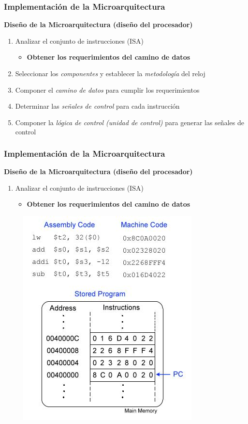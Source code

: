 \documentclass[aspectratio=169,compress]{beamer}
\begin{document}
\begin{footnotesize}
\begin{frame}
\frametitle{Implementación de la Microarquitectura}
\begin{center}\textbf{Diseño de la Microarquitectura (diseño del procesador)}\end{center}
\begin{enumerate}
\item Analizar el conjunto de instrucciones (ISA)
\begin{itemize}
\item \textbf{Obtener los requerimientos del camino de datos}
\end{itemize}
\item Seleccionar los \textit{componentes} y establecer la \textit{metodología} del reloj
\item Componer el \textit{camino de datos} para cumplir los requerimientos
\item Determinar las \textit{señales de control} para cada instrucción
\item Componer la \textit{lógica de control (unidad de control)} para generar las señales de control
\end{enumerate}
\end{frame}


\begin{frame}
\frametitle{Implementación de la Microarquitectura}
\begin{center}\textbf{Diseño de la Microarquitectura (diseño del procesador)}\end{center}
\begin{enumerate}
\item Analizar el conjunto de instrucciones (ISA)
\begin{itemize}
\item \textbf{Obtener los requerimientos del camino de datos}
\end{itemize}
\end{enumerate}
\begin{figure}
\includegraphics[scale=0.4]{images/programa-almacenado.jpg} 
\end{figure}
\end{frame}


\end{footnotesize}
\end{document}
